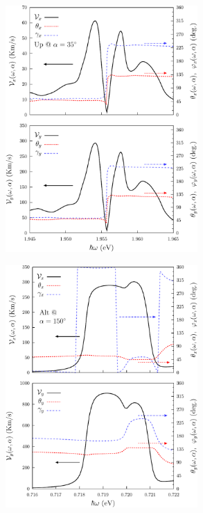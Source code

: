 \documentclass{beamer}
\begin{document}

\begin{frame}

\begin{center}
\includegraphics[width=0.55\textwidth]{figs/fig8.pdf}
\end{center}  

\end{frame}


\begin{frame}

\begin{center}
\includegraphics[width=0.55\textwidth]{figs/fig9.pdf}
\end{center}  

\end{frame}
\end{document}
